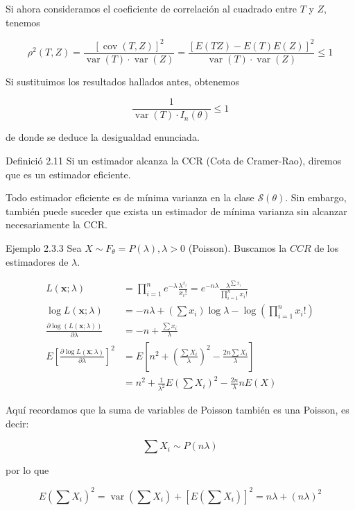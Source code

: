 \documentclass[
]{article}
\begin{document}
Si ahora consideramos el coeficiente de correlación al cuadrado entre \(T\) y \(Z\), tenemos

\[
\rho^{2}(T, Z)=\frac{[\operatorname{cov}(T, Z)]^{2}}{\operatorname{var}(T) \cdot \operatorname{var}(Z)}=\frac{[E(T Z)-E(T) E(Z)]^{2}}{\operatorname{var}(T) \cdot \operatorname{var}(Z)} \leq 1
\]

Si sustituimos los resultados hallados antes, obtenemos

\[
\frac{1}{\operatorname{var}(T) \cdot I_{n}(\theta)} \leq 1
\]

de donde se deduce la desigualdad enunciada.

Definició 2.11 Si un estimador alcanza la CCR (Cota de Cramer-Rao), diremos que es un estimador eficiente.

Todo estimador eficiente es de mínima varianza en la clase \(\mathcal{S}(\theta)\). Sin embargo, también puede suceder que exista un estimador de mínima varianza sin alcanzar necesariamente la CCR.

Ejemplo 2.3.3 Sea \(X \sim F_{\theta}=P(\lambda), \lambda>0\) (Poisson). Buscamos la \(C C R\) de los estimadores de \(\lambda\).

\[
\begin{aligned}
L(\mathbf{x} ; \lambda) & =\prod_{i=1}^{n} e^{-\lambda} \frac{\lambda^{x_{i}}}{x_{i}!}=e^{-n \lambda} \frac{\lambda^{\sum x_{i}}}{\prod_{i=1}^{n} x_{i}!} \\
\log L(\mathbf{x} ; \lambda) & =-n \lambda+\left(\sum x_{i}\right) \log \lambda-\log \left(\prod_{i=1}^{n} x_{i}!\right) \\
\frac{\partial \log (L(\mathbf{x} ; \lambda))}{\partial \lambda} & =-n+\frac{\sum x_{i}}{\lambda} \\
E\left[\frac{\partial \log L(\mathbf{x} ; \lambda)}{\partial \lambda}\right]^{2} & =E\left[n^{2}+\left(\frac{\sum X_{i}}{\lambda}\right)^{2}-\frac{2 n \sum X_{i}}{\lambda}\right] \\
& =n^{2}+\frac{1}{\lambda^{2}} E\left(\sum X_{i}\right)^{2}-\frac{2 n}{\lambda} n E(X)
\end{aligned}
\]

Aquí recordamos que la suma de variables de Poisson también es una Poisson, es decir:

\[
\sum X_{i} \sim P(n \lambda)
\]

por lo que

\[
E\left(\sum X_{i}\right)^{2}=\operatorname{var}\left(\sum X_{i}\right)+\left[E\left(\sum X_{i}\right)\right]^{2}=n \lambda+(n \lambda)^{2}
\]
\end{document}

